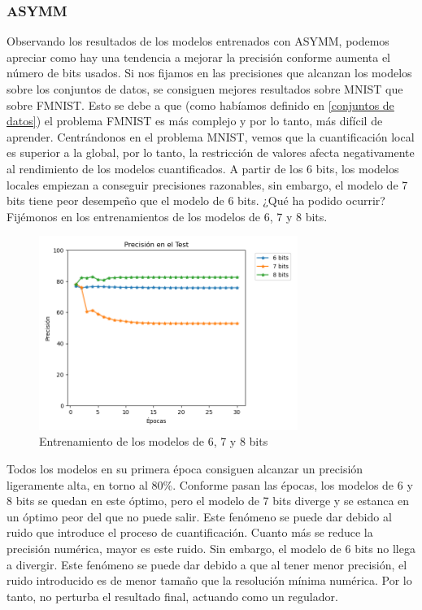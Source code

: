 \subsubsection{ASYMM}

Observando los resultados de los modelos entrenados con ASYMM, podemos apreciar como hay una tendencia a mejorar la precisión conforme aumenta el número de bits usados. Si nos fijamos en las precisiones que alcanzan los modelos sobre los conjuntos de datos, se consiguen mejores resultados sobre MNIST que sobre FMNIST. Esto se debe a que (como habíamos definido en \ref{conjuntos de datos}) el problema FMNIST es más complejo y por lo tanto, más difícil de aprender. Centrándonos en el problema MNIST, vemos que la cuantificación local es superior a la global, por lo tanto, la restricción de valores afecta negativamente al rendimiento de los modelos cuantificados. A partir de los 6 bits, los modelos locales empiezan a conseguir precisiones razonables, sin embargo, el modelo de 7 bits tiene peor desempeño que el modelo de 6 bits. ¿Qué ha podido ocurrir? Fijémonos en los entrenamientos de los modelos de 6, 7 y 8 bits.

\begin{figure}[H]
    \centering
    \includegraphics[width=0.75\textwidth]{imagenes/backprop/678bits.png}
    \caption{Entrenamiento de los modelos de 6, 7 y 8 bits}
    \label{fig:my_label}
\end{figure}

Todos los modelos en su primera época consiguen alcanzar un precisión ligeramente alta, en torno al 80\%. Conforme pasan las épocas, los modelos de 6 y 8 bits se quedan en este óptimo, pero el modelo de 7 bits diverge y se estanca en un óptimo peor del que no puede salir. Este fenómeno se puede dar debido al ruido que introduce el proceso de cuantificación. Cuanto más se reduce la precisión numérica, mayor es este ruido. Sin embargo, el modelo de 6 bits no llega a divergir. Este fenómeno se puede dar debido a que al tener menor precisión, el ruido introducido es de menor tamaño que la resolución mínima numérica. Por lo tanto, no perturba el resultado final, actuando como un regulador. 

